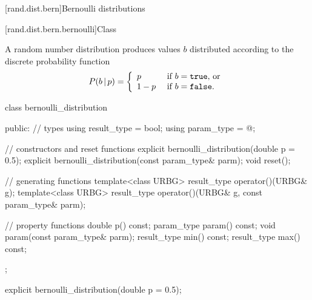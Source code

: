 
[rand.dist.bern]{Bernoulli distributions}%
%
%


[rand.dist.bern.bernoulli]{Class }%
%
%

\pnum
A  random number distribution
produces  values $b$
distributed according to
the discrete probability function
%
%
\[  P(b\,|\,p) = \left\{ \begin{array}{ll}
                          p     & \text{ if $b = \texttt{true}$, or} \\
                          1 - p & \text{ if $b = \texttt{false}$.}
                          \end{array}\right.
\]

%
\begin{codeblock}
class bernoulli_distribution {
public:
  // types
  using result_type = bool;
  using param_type  = @\unspec@;

  // constructors and reset functions
  explicit bernoulli_distribution(double p = 0.5);
  explicit bernoulli_distribution(const param_type& parm);
  void reset();

  // generating functions
  template<class URBG>
    result_type operator()(URBG& g);
  template<class URBG>
    result_type operator()(URBG& g, const param_type& parm);

  // property functions
  double p() const;
  param_type param() const;
  void param(const param_type& parm);
  result_type min() const;
  result_type max() const;
};
\end{codeblock}


%
\begin{itemdecl}
explicit bernoulli_distribution(double p = 0.5);
\end{itemdecl}

